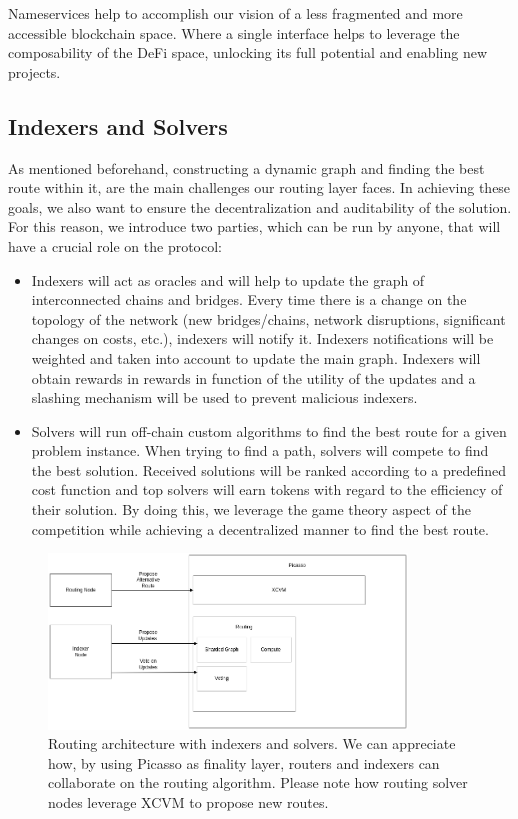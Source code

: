 Nameservices help to accomplish our vision of a less fragmented and more accessible blockchain space. Where a single interface helps to leverage the composability of the DeFi space, unlocking its full potential and enabling new projects.

\subsection{Indexers and Solvers}
As mentioned beforehand, constructing a dynamic graph and finding the best route within it, are the main challenges our routing layer faces. In achieving these goals, we also want to ensure the decentralization and auditability of the solution. For this reason, we introduce two parties, which can be run by anyone, that will have a crucial role on the protocol:

\begin{itemize}
    \item Indexers will act as oracles and will help to update the graph of interconnected chains and bridges. Every time there is a change on the topology of the network (new bridges/chains, network disruptions, significant changes on costs, etc.), indexers will notify it. Indexers notifications will be weighted and taken into account to update the main graph. Indexers will obtain rewards in rewards in function of the utility of the updates and a slashing mechanism will be used to prevent malicious indexers.
    
    \item Solvers will run off-chain custom algorithms to find the best route for a given problem instance. When trying to find a path, solvers will compete to find the best solution. Received solutions will be ranked according to a predefined cost function and top solvers will earn tokens with regard to the efficiency of their solution. By doing this, we leverage the game theory aspect of the competition while achieving a decentralized manner to find the best route.
    
\end{itemize}

\begin{figure}[h]
    \centering
    \includegraphics[width=0.85\textwidth]{images/routing.png}
    \caption{Routing architecture with indexers and solvers. We can appreciate how, by using Picasso as finality layer, routers and indexers can collaborate on the routing algorithm. Please note how routing solver nodes leverage XCVM to propose new routes.}
    \label{fig:routing}
\end{figure}

